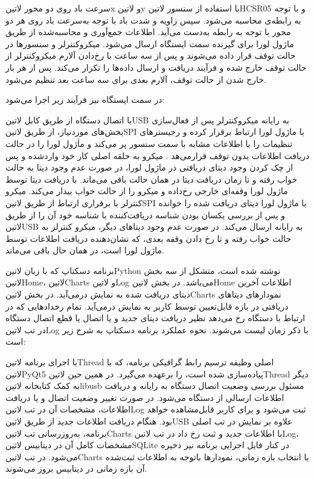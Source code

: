 سرعت باد روی دو محور ‌لاتین{x} و ‌لاتین{y} با استفاده از سنسور ‌لاتین{HCSR05} و با توجه به رابطه‌ی  محاسبه می‌شود. سپس زاویه و شدت باد با توجه به‌سرعت باد روی هر دو محور با توجه به رابطه  به‌دست می‌آید.
اطلاعات جمع‌آوری و محاسبه‌شده از طریق ماژول لورا برای گیرنده سمت ایستگاه ارسال می‌شود.
میکروکنترلر و سنسورها در حالت توقف قرار داده می‌شوند و پس از سه ساعت با رخ‌دادن آلارم میکروکنترلر از حالت توقف خارج شده و فرآیند دریافت و ارسال داده‌ها را تکرار می‌کند.
پس از هر بار خارج شدن از حالت توقف، آلارم بعدی برای سه ساعت بعد تنظیم می‌شود.

در سمت ایستگاه نیز فرآیند زیر اجرا می‌شود:

با اتصال دستگاه از طریق کابل ‌لاتین{USB} به رایانه میکروکنترلر پس از فعال‌سازی بخش‌های موردنیاز، از طریق ‌لاتین{SPI} با ماژول لورا ارتباط برقرار کرده و رجیسترهای تنظیمات را با اطلاعات مشابه با سمت سنسور پر می‌کند و ماٰژول لورا را در حالت دریافت اطلاعات بدون توقف  قرارمی‌هد .
میکرو به حلقه اصلی کار خود واردشده و پس از چک کردن وجود دیتای دریافتی در ماژول لورا، در صورت عدم وجود دیتا به حالت خواب  رفته و تا زمان دریافت دیتا در همان حالت باقی می‌ماند.
با دریافت دیتا توسط ماژول لورا وقفه‌ای خارجی رخ‌داده و میکرو را از حالت خواب بیدار می‌کند.
میکرو کنترلر با برقراری ارتباط از طریق ‌لاتین{SPI} با ماژول لورا دیتای دریافت شده را خوانده و پس از بررسی یکسان بودن شناسه دریافت‌کننده با شناسه خود آن را از طریق ‌لاتین{USB} به رایانه ارسال می‌کند.
در صورت عدم وجود دیتاهای دیگر، میکرو کنترلر به حالت خواب رفته و تا رخ دادن وقفه بعدی، که نشان‌دهنده دریافت اطلاعات توسط ماژول لورا است، در همان حال باقی می‌ماند.

برنامه دسکتاپ که با زبان ‌لاتین{Python} نوشته شده است، متشکل از سه بخش ‌لاتین{Home}، ‌لاتین{Charts} و ‌لاتین{Log} می‌باشد. در بخش ‌لاتین{Home} اطلاعات آخرین دیتای دریافت شده به نمایش درمی‌آید. در بخش ‌لاتین{Charts} نمودارهای دیتاهای دریافتی در بازه قابل‌تعیین توسط کاربر به نمایش درمی‌آید. تمام رخدادهایی که در ارتباط با دستگاه رخ می‌دهد نظیر دریافت دیتای جدید و یا اتصال یا قطع اتصال دستگاه در تب ‌لاتین{Log} با ذکر زمان لیست می‌شوند. نحوه عملکرد برنامه دسکتاپ به شرح زیر است:

با اجرای برنامه ‌لاتین{Thread} اصلی وظیفه ترسیم رابط گرافیکی برنامه، که با ‌لاتین{PyQt5} پیاده‌سازی شده است، را برعهده می‌گیرد.
در همین حین ‌لاتین{Thread} دیگر به کمک کتابخانه ‌لاتین{libusb} مسئول بررسی وضعیت اتصال دستگاه به رایانه و دریافت اطلاعات ارسالی از دستگاه می‌شود.
در صورت تغییر وضعیت اتصال و یا دریافت اطلاعات، مشخصات آن در تب ‌لاتین{Log} ثبت می‌شود و برای کاربر قابل‌مشاهده خواهد بود.
هنگام دریافت اطلاعات جدید از طریق ‌لاتین{USB} علاوه بر نمایش در تب اصلی برنامه، به‌روزرسانی تب ‌لاتین{Charts} با اطلاعات جدید و ثبت رخ داد در تب ‌لاتین{Log}، مشخصات کامل آن در دیتابیس ‌لاتین{SQLite} در کنار فایل اجرایی برنامه نیز ذخیره می‌شود. 
در تب ‌لاتین{Charts} با انتخاب بازه زمانی، نمودارها باتوجه به اطلاعات ثبت‌شده آن بازه زمانی در دیتابیس بروز می‌شوند.

